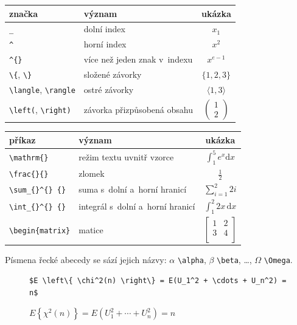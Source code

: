 \begin{table}[ht]
\centering
\begin{tabular}{|l|l|c|}
značka & význam & ukázka \\
\hline \hline
\texttt{\_} & dolní index & $x_1$ \\
\texttt{\^} & horní index & $x^2$ \\
\verb|^{}|  & více než jeden znak v~indexu & $x^{e-1}$ \\
\verb|\{|, \verb|\}| & složené závorky & $\{1, 2, 3\}$ \\
\verb|\langle|, \verb|\rangle| & ostré závorky & $\langle 1, 3 \rangle$ \\
\verb|\left(|, \verb|\right)| & závorka přizpůsobená obsahu & $\left(\begin{matrix}1\\2\end{matrix}\right)$
\end{tabular}
\end{table}

\begin{table}[ht]
\centering
\begin{tabular}{|l|l|c|}
příkaz & význam & ukázka \\
\hline \hline
\verb|\mathrm{}| & režim textu uvnitř vzorce & $\int_1^5 e^x \mathrm{d}x$ \\
\verb|\frac{}{}| & zlomek & $\frac{1}{2}$ \\
\verb|\sum_{}^{} {}| & suma s~dolní a~horní hranicí & $\sum_{i=1}^{2} 2i$ \\
\verb|\int_{}^{} {}| & integrál s~dolní a~horní hranicí & $\int_{1}^{2} 2x \, \mathrm{d}x$ \\
\verb|\begin{matrix}| & matice & $\left[ \begin{matrix}
1 & 2 \\
3 & 4 \\
\end{matrix} \right]$ \\
\end{tabular}
\end{table}

Písmena řecké abecedy se sází jejich názvy: $\alpha$ \verb|\alpha|, $\beta$ \verb|\beta|, \dots, $\Omega$ \verb|\Omega|.

\begin{figure}[ht]
\begin{mdframed}
\onehalfspacing
\begin{verbatim}
$E \left\{ \chi^2(n) \right\} = E(U_1^2 + \cdots + U_n^2) = n$
\end{verbatim}

$E \left\{ \chi^2(n) \right\} = E(U_1^2 + \cdots + U_n^2) = n$
\end{mdframed}
\end{figure}
\FloatBarrier

